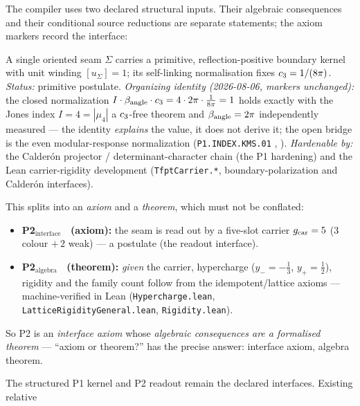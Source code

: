 \begin{keybox}
The compiler uses two declared structural inputs. Their algebraic consequences and their
conditional source reductions are separate statements; the axiom markers record the interface:
\begin{description}[leftmargin=2.2em,style=nextline]
  \item[\textnormal{(P1) Boundary kernel.}] A single oriented seam $\Sigma$ carries a primitive,
  reflection-positive boundary kernel with unit winding $[u_\Sigma]=1$; its self-linking normalisation
  fixes $c_3=1/(8\pi)$. \emph{Status:} primitive postulate. \emph{Organizing identity (2026-08-06,
  markers unchanged):} the closed normalization $I\cdot\beta_{\rm angle}\cdot c_3=4\cdot2\pi\cdot
  \tfrac1{8\pi}=1$ holds exactly with the Jones index $I=4=|\mu_4|$ a $c_3$-free theorem and
  $\beta_{\rm angle}=2\pi$ independently measured --- the identity \emph{explains} the value, it does
  not derive it; the open bridge is the even modular-response normalization
  (\texttt{P1.INDEX.KMS.01} \mO, ). \emph{Hardenable by:} the Calder\'on
  projector / determinant-character chain (the P1 hardening) and the Lean carrier-rigidity development
  (\texttt{TfptCarrier.*}, boundary-polarization and Calder\'on interfaces).
  \item[\textnormal{(P2) Carrier interface.}] This splits into an \emph{axiom} and a \emph{theorem},
  which must not be conflated:
  \begin{itemize}\setlength\itemsep{1pt}
  \item \textbf{P2$_{\mathrm{interface}}$ \mO\ (axiom):} the seam is read out by a five-slot carrier
  $g_{\mathrm{car}}=5$ ($3$ colour $+\,2$ weak) --- a postulate (the readout interface).
  \item \textbf{P2$_{\mathrm{algebra}}$ \mE\ (theorem):} \emph{given} the carrier, hypercharge
  ($y_-=-\tfrac13$, $y_+=\tfrac12$), rigidity and the family count follow from the idempotent/lattice
  axioms --- machine-verified in Lean (\texttt{Hypercharge.lean}, \texttt{LatticeRigidityGeneral.lean},
  \texttt{Rigidity.lean}).
  \end{itemize}
  So P2 is an \emph{interface axiom} whose \emph{algebraic consequences are a formalised theorem} ---
  ``axiom or theorem?'' has the precise answer: interface axiom, algebra theorem.
\end{description}
The structured P1 kernel and P2 readout remain the declared interfaces. Existing relative

\end{keybox}
